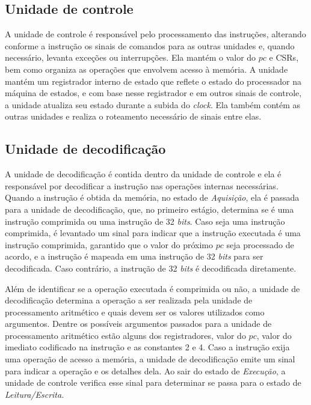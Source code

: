 \subsection{Unidade de controle}
\label{ssec:udc}

A unidade de controle é responsável pelo processamento das instruções, alterando conforme a instrução os sinais de comandos
para as outras unidades e, quando necessário, levanta exceções ou interrupções. Ela mantém o valor do $pc$ e CSRs, bem como
organiza as operações que envolvem acesso à memória.
A unidade mantém um registrador interno de estado que reflete o estado do processador na máquina de estados, e com base nesse
registrador e em outros sinais de controle, a unidade atualiza seu estado durante a subida do \emph{clock}. Ela também contém 
as outras unidades e realiza o roteamento necessário de sinais entre elas.

\subsection{Unidade de decodificação}
\label{ssec:decode}

A unidade de decodificação é contida dentro da unidade de controle e ela é responsável por decodificar a instrução nas
operações internas
necessárias. Quando a instrução é obtida da memória, no estado de \emph{Aquisição}, ela é passada para a unidade de decodificação,
que, no primeiro estágio, determina se é uma instrução comprimida ou uma instrução de 32 \emph{bits}. Caso seja uma instrução
comprimida, é levantado um sinal para indicar que a instrução executada é uma instrução comprimida, garantido que o valor do
próximo $pc$ seja processado de acordo, e a instrução é mapeada em uma instrução de 32 \emph{bits} para ser decodificada.
Caso contrário, a instrução de 32 \emph{bits} é decodificada diretamente.

Além de identificar se a operação executada é comprimida ou não, a unidade de decodificação determina a operação a ser
realizada pela unidade de processamento aritmético e quais devem ser os valores utilizados como argumentos. Dentre os
possíveis argumentos passados para a unidade de processamento aritmético estão alguns dos registradores,
valor do $pc$, valor do imediato codificado na instrução e as constantes 2 e 4.
Caso a instrução exija uma operação de acesso a memória, a unidade de decodificação emite um sinal para indicar a operação 
e os detalhes dela. Ao sair do estado de \emph{Execução}, a unidade de controle verifica esse sinal para determinar
se passa para o estado de \emph{Leitura/Escrita}.

